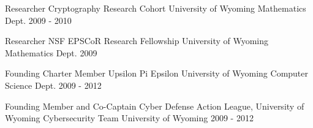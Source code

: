 


\begin{cvhonors}


\cvhonor
{Researcher} %
{Cryptography Research Cohort} %
{University of Wyoming Mathematics Dept.} %
{2009 - 2010} %


\cvhonor
{Researcher} %
{NSF EPSCoR Research Fellowship} %
{University of Wyoming Mathematics Dept.} %
{2009} %


\cvhonor
{Founding Charter Member} %
{Upsilon Pi Epsilon} %
{University of Wyoming Computer Science Dept.} %
{2009 - 2012} %


\cvhonor
{Founding Member and Co-Captain} %
{Cyber Defense Action League, University of Wyoming Cybersecurity Team} %
{University of Wyoming} %
{2009 - 2012} %


\end{cvhonors}